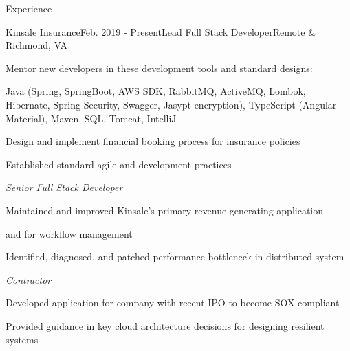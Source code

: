 \documentclass{resume} %
\begin{document}

\begin{rSection}{Experience}

\begin{rSubsection}{Kinsale Insurance}{Feb. 2019 - Present}{\vspace{-0.5em}Lead Full Stack Developer}{Remote \& Richmond, VA}
	\setlength{\itemindent}{.0in}\item{
		Mentor new developers in these development tools and standard designs:
	}
	\setlength{\itemindent}{.0in}\item{
		Java (Spring, SpringBoot, AWS SDK, RabbitMQ, ActiveMQ, Lombok, Hibernate, Spring Security, Swagger, Jasypt encryption), TypeScript (Angular Material), Maven, SQL, Tomcat, IntelliJ
	}
	\setlength{\itemindent}{.0in}\item{
		Design and implement financial booking process for insurance policies
	}
	\setlength{\itemindent}{.0in}\item{
		Established standard agile and development practices 
	}
	

    \emph{Senior Full Stack Developer}
    \setlength{\itemindent}{.0in}\item{
    	Maintained and improved Kinsale's primary revenue generating application
    }
	\setlength{\itemindent}{.0in}\item{ 
		 and for workflow management
	}
	\setlength{\itemindent}{.0in}\item{
		Identified, diagnosed, and patched performance bottleneck in distributed system
	}
	
	
	\emph{Contractor}
	\setlength{\itemindent}{.0in}\item{ 
		Developed application for company with recent IPO to become SOX compliant
	}
	\setlength{\itemindent}{.0in}\item{ 
		Provided guidance in key cloud architecture decisions for designing resilient systems
	}
	
	
\end{rSubsection}



\end{rSection}
\end{document}
